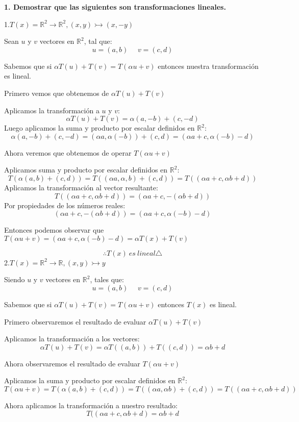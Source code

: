 \documentclass{article}
\begin{document}
\textbf{1. Demostrar que las siguientes son transformaciones lineales.}

1.$T(x)=\mathbb{R}^2\rightarrow\mathbb{R}^2, (x,y)\rightarrowtail(x,-y)$

Sean $u$ y $v$ vectores en $\mathbb{R}^2$, tal que:$$u=(a,b)\ \ \ \ \ \ v=(c,d)$$

Sabemos que si $\alpha T(u)+T(v)=T(\alpha u + v)$ entonces nuestra transformación es lineal.

Primero vemos que obtenemos de $\alpha T(u)+T(v)$

Aplicamos la transformación a $u$ y $v$: $$\alpha T(u)+T(v)= \alpha (a,-b) + (c,-d)$$
Luego aplicamos la suma y producto por escalar definidos en $\mathbb{R}^2$: $$\alpha (a,-b) + (c,-d)=(\alpha a, \alpha(-b))+(c,d)=(\alpha a + c, \alpha(-b) - d)$$

Ahora veremos que obtenemos de operar $T(\alpha u + v)$

Aplicamos suma y producto por escalar definidos en $\mathbb{R}^2$: $$T(\alpha(a,b)+(c,d))=T((\alpha a,\alpha, b)+(c,d))=T((\alpha a + c, \alpha b+d))$$
Aplicamos la transformación al vector resultante: $$T((\alpha a + c, \alpha b+d))=(\alpha a + c, -(\alpha b+d))$$
Por propiedades de los números reales:$$(\alpha a + c, -(\alpha b+d))=(\alpha a + c,\alpha(-b)-d)$$

Entonces podemos observar que $T(\alpha u + v)=(\alpha a + c, \alpha (-b)-d)=\alpha T(x)+T(v)$

$$\therefore T(x)\ es\ lineal\triangle$$
2.$T(x)=\mathbb{R}^2\rightarrow\mathbb{R}, (x,y)\rightarrowtail y$

Siendo $u$ y $v$ vectores en $\mathbb{R}^2$, tales que: $$u=(a,b)\ \ \ \ \ \ v=(c,d)$$

Sabemos que si $\alpha T(u)+T(v)=T(\alpha u + v)$ entonces $T(x)$ es lineal.

Primero observaremos el resultado de evaluar $\alpha T(u) + T(v)$

Aplicamos la transformación a los vectores:  $$\alpha T(u) + T(v)=\alpha T((a,b)) + T((c,d))=\alpha b+ d$$

Ahora observaremos el resultado de evaluar $T(\alpha u + v)$

Aplicamos la suma y producto por escalar definidos en $\mathbb{R}^2$: $$T(\alpha u + v)=T(\alpha (a,b) + (c,d))=T((\alpha a, \alpha b)+ (c,d))=T((\alpha a + c , \alpha b+d))$$

Ahora aplicamos la transformación a nuestro resultado: $$T((\alpha a + c,\alpha b + d )= \alpha b + d$$
\end{document}
